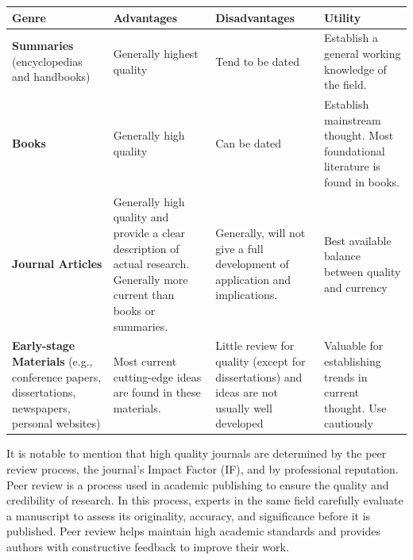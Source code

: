 \documentclass[
  letterpaper,
  DIV=11,
  numbers=noendperiod]{scrreprt}
\begin{document}
\begin{longtable}[]{@{}
  >{\raggedright\arraybackslash}p{}
  >{\raggedright\arraybackslash}p{}
  >{\raggedright\arraybackslash}p{}
  >{\raggedright\arraybackslash}p{}@{}}
\toprule\noalign{}
\begin{minipage}[b]{\linewidth}\raggedright
\textbf{Genre}
\end{minipage} & \begin{minipage}[b]{\linewidth}\raggedright
\textbf{Advantages}
\end{minipage} & \begin{minipage}[b]{\linewidth}\raggedright
\textbf{Disadvantages}
\end{minipage} & \begin{minipage}[b]{\linewidth}\raggedright
\textbf{Utility}
\end{minipage} \\
\midrule\noalign{}
\endhead
\bottomrule\noalign{}
\endlastfoot
\textbf{Summaries} (encyclopedias and handbooks) & Generally highest
quality & Tend to be dated & Establish a general working knowledge of
the field. \\
\textbf{Books} & Generally high quality & Can be dated & Establish
mainstream thought. Most foundational literature is found in books. \\
\textbf{Journal Articles} & Generally high quality and provide a clear
description of actual research. Generally more current than books or
summaries. & Generally, will not give a full development of application
and implications. & Best available balance between quality and
currency \\
\textbf{Early-stage Materials} (e.g., conference papers, dissertations,
newspapers, personal websites) & Most current cutting-edge ideas are
found in these materials. & Little review for quality (except for
dissertations) and ideas are not usually well developed & Valuable for
establishing trends in current thought. Use cautiously \\
\end{longtable}

It is notable to mention that high quality journals are determined by
the peer review process, the journal's Impact Factor (IF), and by
professional reputation. Peer review is a process used in academic
publishing to ensure the quality and credibility of research. In this
process, experts in the same field carefully evaluate a manuscript to
assess its originality, accuracy, and significance before it is
published. Peer review helps maintain high academic standards and
provides authors with constructive feedback to improve their work.
\end{document}
